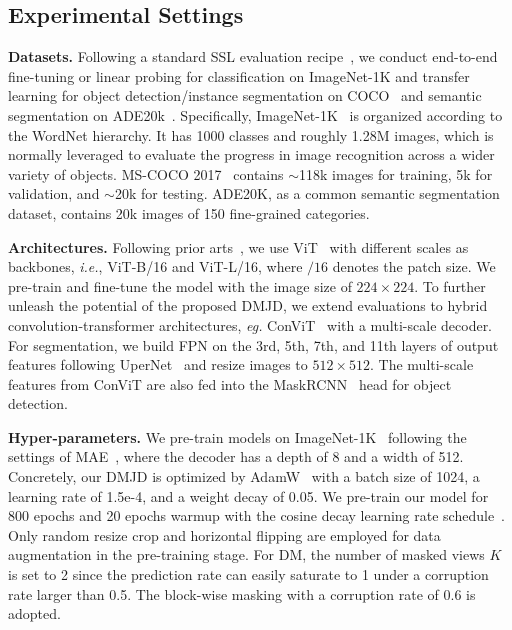 \documentclass[lettersize,journal]{IEEEtran}
\begin{document}
\subsection{Experimental Settings}
\textbf{Datasets.} Following a standard SSL evaluation recipe~\cite{2021arXiv211106377H, 2022arXiv220503892G}, we conduct end-to-end fine-tuning or linear probing for classification on ImageNet-1K and transfer learning for object detection/instance segmentation on COCO~\cite{TsungYiLin2014MicrosoftCC} and semantic segmentation on ADE20k~\cite{Zhou2017ScenePT}. 
Specifically, ImageNet-1K~\cite{Deng2009ImageNetAL} is organized according to the WordNet hierarchy. It has 1000 classes and roughly 1.28M images, which is normally leveraged to evaluate the progress in image recognition across a wider variety of objects. 
MS-COCO 2017~\cite{TsungYiLin2014MicrosoftCC} contains $\sim$118k images for training, 5k for validation, and $\sim$20k for testing. ADE20K, as a common semantic segmentation dataset, contains 20k images of 150 fine-grained categories.


\textbf{Architectures.}
Following prior arts~\cite{2021arXiv211106377H,2021arXiv210608254B,2021arXiv211109886X}, we use ViT~\cite{2021arXiv210313915S} with different scales as backbones, \textit{i.e.}, ViT-B/16 and ViT-L/16, where $/16$ denotes the patch size. We pre-train and fine-tune the model with the image size of $224 \times 224$. 
To further unleash the potential of the proposed DMJD, we extend evaluations to hybrid convolution-transformer architectures, \textit{eg.} ConViT~\cite{2022arXiv220503892G} with a multi-scale decoder.  
For segmentation, we build FPN on the 3rd, 5th, 7th, and 11th layers of output features following UperNet~\cite{Xiao2018UnifiedPP} and resize images to $512 \times 512$. 
The multi-scale features from ConViT are also fed into the MaskRCNN~\cite{He2020MaskR} head for object detection.

\textbf{Hyper-parameters.}
We pre-train models on ImageNet-1K~\cite{Deng2009ImageNetAL} following the settings of MAE~\cite{2021arXiv211106377H}, where the decoder has a depth of 8 and a width of 512. Concretely, our DMJD is optimized by AdamW~\cite{Loshchilov2019DecoupledWD} with a batch size of 1024, a learning rate of 1.5e-4, and a weight decay of 0.05. 
We pre-train our model for 800 epochs and 20 epochs warmup with the cosine decay learning rate schedule~\cite{2016arXiv160803983L}. Only random resize crop and horizontal flipping are employed for data augmentation in the pre-training stage.  
For DM, the number of masked views $K$ is set to 2 since the prediction rate can easily saturate to 1 under a corruption rate larger than 0.5. The block-wise masking with a corruption rate of 0.6 is adopted. 
\end{document}
